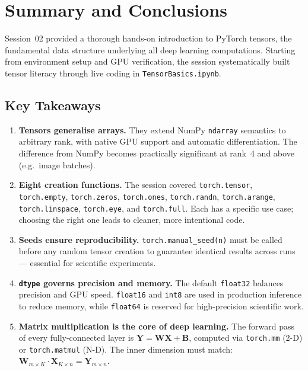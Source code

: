\documentclass[12pt,a4paper]{article}
\newcommand{\tbf}[1]{\textbf{#1}}
\newcommand{\ttt}[1]{\texttt{#1}}
\begin{document}
\section{Summary and Conclusions}
\label{sec:summary}

Session~02 provided a thorough hands-on introduction to PyTorch tensors, the
fundamental data structure underlying all deep learning computations. Starting
from environment setup and GPU verification, the session systematically built
tensor literacy through live coding in \ttt{TensorBasics.ipynb}.

\subsection*{Key Takeaways}

\begin{enumerate}[label=\arabic*., leftmargin=*]
  \item \tbf{Tensors generalise arrays.} They extend NumPy \ttt{ndarray}
        semantics to arbitrary rank, with native GPU support and automatic
        differentiation. The difference from NumPy becomes practically
        significant at rank~4 and above (e.g.\ image batches).

  \item \tbf{Eight creation functions.} The session covered
        \ttt{torch.tensor}, \ttt{torch.empty}, \ttt{torch.zeros},
        \ttt{torch.ones}, \ttt{torch.randn}, \ttt{torch.arange},
        \ttt{torch.linspace}, \ttt{torch.eye}, and \ttt{torch.full}.
        Each has a specific use case; choosing the right one leads to
        cleaner, more intentional code.

  \item \tbf{Seeds ensure reproducibility.} \ttt{torch.manual\_seed(n)}
        must be called before any random tensor creation to guarantee
        identical results across runs --- essential for scientific
        experiments.

  \item \tbf{\ttt{dtype} governs precision and memory.} The default
        \ttt{float32} balances precision and GPU speed. \ttt{float16}
        and \ttt{int8} are used in production inference to reduce memory,
        while \ttt{float64} is reserved for high-precision scientific work.

  \item \tbf{Matrix multiplication is the core of deep learning.}
        The forward pass of every fully-connected layer is
        $\mathbf{Y} = \mathbf{W}\mathbf{X} + \mathbf{B}$, computed via
        \ttt{torch.mm} (2-D) or \ttt{torch.matmul} (N-D). The inner
        dimension must match: $\mathbf{W}_{m \times K} \cdot \mathbf{X}_{K \times n}
        = \mathbf{Y}_{m \times n}$.
\end{enumerate}
\end{document}
